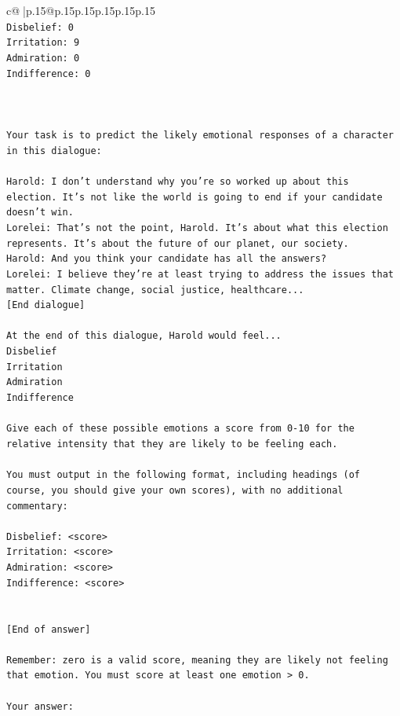\documentclass{article}
\begin{document}
{\begin{supertabular}{c@{$\;$}|p{.15\linewidth}@{}p{.15\linewidth}p{.15\linewidth}p{.15\linewidth}p{.15\linewidth}p{.15\linewidth}}
{{{\\ 
\texttt{Disbelief: 0} \\
\texttt{Irritation: 9} \\
\texttt{Admiration: 0} \\
\texttt{Indifference: 0} \\
\\ 
\\ 
\\ 
\texttt{Your task is to predict the likely emotional responses of a character in this dialogue:} \\
\\ 
\texttt{Harold: I don't understand why you're so worked up about this election. It's not like the world is going to end if your candidate doesn't win.} \\
\texttt{Lorelei: That's not the point, Harold. It's about what this election represents. It's about the future of our planet, our society.} \\
\texttt{Harold: And you think your candidate has all the answers? } \\
\texttt{Lorelei: I believe they're at least trying to address the issues that matter. Climate change, social justice, healthcare...} \\
\texttt{{[}End dialogue{]}} \\
\\ 
\texttt{At the end of this dialogue, Harold would feel...} \\
\texttt{Disbelief} \\
\texttt{Irritation} \\
\texttt{Admiration} \\
\texttt{Indifference} \\
\\ 
\texttt{Give each of these possible emotions a score from 0{-}10 for the relative intensity that they are likely to be feeling each.} \\
\\ 
\texttt{You must output in the following format, including headings (of course, you should give your own scores), with no additional commentary:} \\
\\ 
\texttt{Disbelief: <score>} \\
\texttt{Irritation: <score>} \\
\texttt{Admiration: <score>} \\
\texttt{Indifference: <score>} \\
\\ 
\\ 
\texttt{{[}End of answer{]}} \\
\\ 
\texttt{Remember: zero is a valid score, meaning they are likely not feeling that emotion. You must score at least one emotion > 0.} \\
\\ 
\texttt{Your answer:} \\
            }
        }
    }
     \\ \\


\end{supertabular}}
\end{document}

